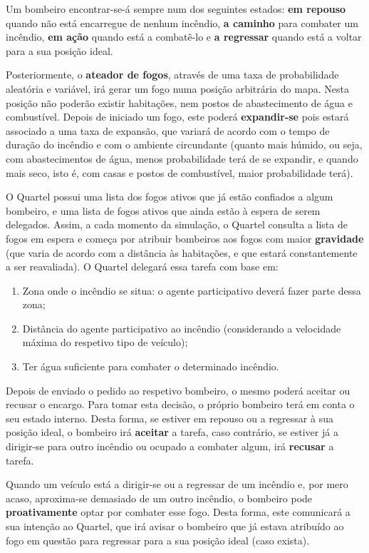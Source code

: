 \documentclass[a4paper]{article}
\begin{document}
Um bombeiro encontrar-se-á sempre num dos seguintes estados: \textbf{em repouso} quando não está encarregue de nenhum incêndio, \textbf{a caminho} para combater um incêndio, \textbf{em ação} quando está a combatê-lo e \textbf{a regressar} quando está a voltar para a sua posição ideal.

Posteriormente, o \textbf{ateador de fogos}, através de uma taxa de probabilidade aleatória e variável, irá gerar um fogo numa posição arbitrária do mapa. Nesta posição não poderão existir habitações, nem postos de abastecimento de água e combustível. Depois de iniciado um fogo, este poderá \textbf{expandir-se} pois estará associado a uma taxa de expansão, que variará de acordo com o tempo de duração do incêndio e com o ambiente circundante (quanto mais húmido, ou seja, com abastecimentos de água, menos probabilidade terá de se expandir, e quando mais seco, isto é, com casas e postos de combustível, maior probabilidade terá).

O Quartel possui uma lista dos fogos ativos que já estão confiados a algum bombeiro, e uma lista de fogos ativos que ainda estão à espera de serem delegados. Assim, a cada momento da simulação, o Quartel consulta a lista de fogos em espera e começa por atribuir bombeiros aos fogos com maior \textbf{gravidade} (que varia de acordo com a distância às habitações, e que estará constantemente a ser reavaliada). O Quartel delegará essa tarefa com base em:

\begin{enumerate}
    \item Zona onde o incêndio se situa: o agente participativo deverá fazer parte dessa zona;
    \item Distância do agente participativo ao incêndio (considerando a velocidade máxima do respetivo tipo de veículo);
    \item Ter água suficiente para combater o determinado incêndio.
\end{enumerate}

Depois de enviado o pedido ao respetivo bombeiro, o mesmo poderá aceitar ou recusar o encargo. Para tomar esta decisão, o próprio bombeiro terá em conta o seu estado interno. Desta forma, se estiver em repouso ou a regressar à sua posição ideal, o bombeiro irá \textbf{aceitar} a tarefa, caso contrário, se estiver já a dirigir-se para outro incêndio ou ocupado a combater algum, irá \textbf{recusar} a tarefa.

Quando um veículo está a dirigir-se ou a regressar de um incêndio e, por mero acaso, aproxima-se demasiado de um outro incêndio, o bombeiro pode \textbf{proativamente} optar por combater esse fogo. Desta forma, este comunicará a sua intenção ao Quartel, que irá avisar o bombeiro que já estava atribuído ao fogo em questão para regressar para a sua posição ideal (caso exista).
\end{document}
